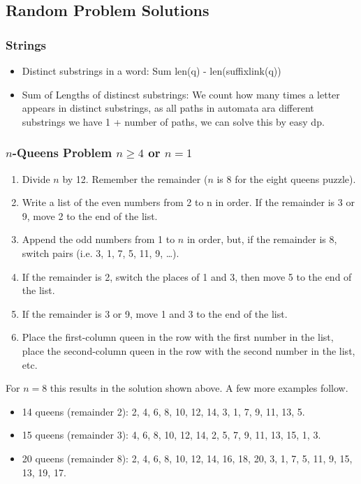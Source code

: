         \subsection{Random Problem Solutions}
        \subsubsection{Strings}
        \begin{itemize}
        \item Distinct substrings in a word: Sum len(q) - len(suffixlink(q))
        \item Sum of Lengths of distincst substrings: We count how many times a letter appears in distinct substrings, as all paths in automata ara different substrings we have 1 + number of paths, we can solve this by easy dp.
        \end{itemize}
        \subsubsection{$n$-Queens Problem $n\geq 4$ or $n=1$}
        \begin{enumerate}
        \item Divide $n$ by 12. Remember the remainder ($n$ is 8 for the eight queens puzzle).
        \item Write a list of the even numbers from 2 to n in order. If the remainder is 3 or 9, move 2 to the end of the list.
        \item Append the odd numbers from 1 to $n$ in order, but, if the remainder is 8, switch pairs (i.e. 3, 1, 7, 5, 11, 9, \ldots).
        \item If the remainder is 2, switch the places of 1 and 3, then move 5 to the end of the list.
        \item If the remainder is 3 or 9, move 1 and 3 to the end of the list.
        \item Place the first-column queen in the row with the first number in the list,  place the second-column queen in the row with the second number in the list, etc.
        \end{enumerate}
        For $n = 8$ this results in the solution shown above. A few more examples follow.
        \begin{itemize}
        \item 14 queens (remainder 2): 2, 4, 6, 8, 10, 12, 14, 3, 1, 7, 9, 11, 13, 5.
        \item 15 queens (remainder 3): 4, 6, 8, 10, 12, 14, 2, 5, 7, 9, 11, 13, 15, 1, 3.
        \item 20 queens (remainder 8): 2, 4, 6, 8, 10, 12, 14, 16, 18, 20, 3, 1, 7, 5, 11, 9, 15, 13, 19, 17.
        \end{itemize}


